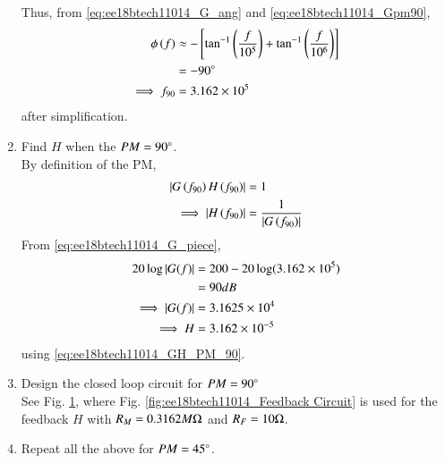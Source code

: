 \begin{enumerate}[label=\thesection.\arabic*.,ref=\thesection.\theenumi]
Thus, from  \eqref{eq:ee18btech11014_G_ang} and \eqref{eq:ee18btech11014_Gpm90},
%
\begin{align}
\phi\left(f\right) &\approx
-{}\left[\tan ^{-1}\left(\frac{f}{10^{5}}\right)+\tan ^{-1}\left(\frac{f}{10^{6}}\right)\right]
\\
&= -90 \degree
\\
\implies f_{90} &= 3.162 \times 10^{5}
\end{align}
after simplification.
\item Find $H$ when the $PM = 90 \degree$.
\\
\solution By definition of the PM, 
\begin{align}
\left\vert G\left(f_{90}\right)H\left(f_{90}\right)\right\vert &=1
\\
\implies \left\vert H\left(f_{90}\right)\right\vert &=\frac{1}{\left\vert G\left(f_{90}\right)\right\vert}
\label{eq:ee18btech11014_GH_PM_90}
\end{align}
%
From \eqref{eq:ee18btech11014_G_piece},
\begin{align}
20 \log \left\vert G(f)\right\vert &= 200 - 20\log(3.162 \times 10^{5})\\
&= 90 dB \\
\implies \left\vert G(f)\right\vert &= 3.1625 \times 10^{4}
\\
\implies H &= 3.162 \times 10^{-5}
\end{align}
using \eqref{eq:ee18btech11014_GH_PM_90}.
\item Design the closed loop circuit for $PM = 90 \degree$
\\
\solution See Fig. 	\ref{fig:ee18btech11014_Closed-Loop Circuit alpha=90}, where Fig. 	\ref{fig:ee18btech11014_Feedback Circuit} is used for the feedback $H$ with $R_M = 0.3162 M \ohm$ and 	$R_F = 10 \ohm$.

\begin{figure}[ht!]
	\begin{center}
		\resizebox{\columnwidth}{!}{}
	\end{center}
	\caption{}
	\label{fig:ee18btech11014_Closed-Loop Circuit alpha=90}
\end{figure}

\item Repeat all the above for $PM = 45\degree$.


\end{enumerate}
